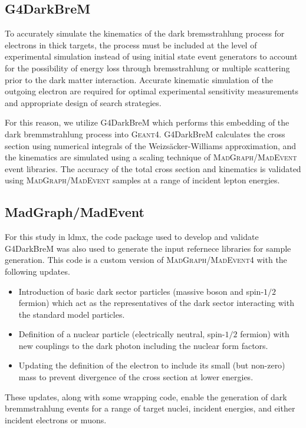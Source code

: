 \subsection{G4DarkBreM}
To accurately simulate the kinematics of the dark bremsstrahlung process for electrons in thick
targets, the process must be included at the level of experimental simulation instead of using
initial state event generators to account for the possibility of energy loss through bremsstrahlung
or multiple scattering prior to the dark matter interaction. Accurate kinematic simulation of the
outgoing electron are required for optimal experimental sensitivity measurements and appropriate
design of search strategies.

For this reason, we utilize G4DarkBreM \cite{g4darkbrem} which performs this embedding of the dark
bremmstrahlung process into \textsc{Geant}4. G4DarkBreM calculates the cross section using
numerical integrals of the Weizs\"{a}cker-Williams approximation, and the kinematics are simulated
using a scaling technique of \textsc{MadGraph/MadEvent} event libraries. The accuracy of the total
cross section and kinematics is validated using \textsc{MadGraph/MadEvent} samples at a range of
incident lepton energies.

\subsection{MadGraph/MadEvent}
For this study in \ac{ldmx}, the code package used to develop and validate G4DarkBreM was also used
to generate the input refernece libraries for sample generation. This code is a custom version of
\textsc{MadGraph/MadEvent4} with the following updates.
\begin{itemize}
  \item Introduction of basic dark sector particles (massive boson and spin-$1/2$ fermion) which act as the
        representatives of the dark sector interacting with the standard model particles.
  \item Definition of a nuclear particle (electrically neutral, spin-$1/2$ fermion) with new couplings to
        the dark photon including the nuclear form factors.
  \item Updating the definition of the electron to include its small (but non-zero) mass to prevent
        divergence of the cross section at lower energies.
\end{itemize}
These updates, along with some wrapping code, enable the generation of
dark bremmstrahlung events for a range of target nuclei, incident energies,
and either incident electrons or muons.

